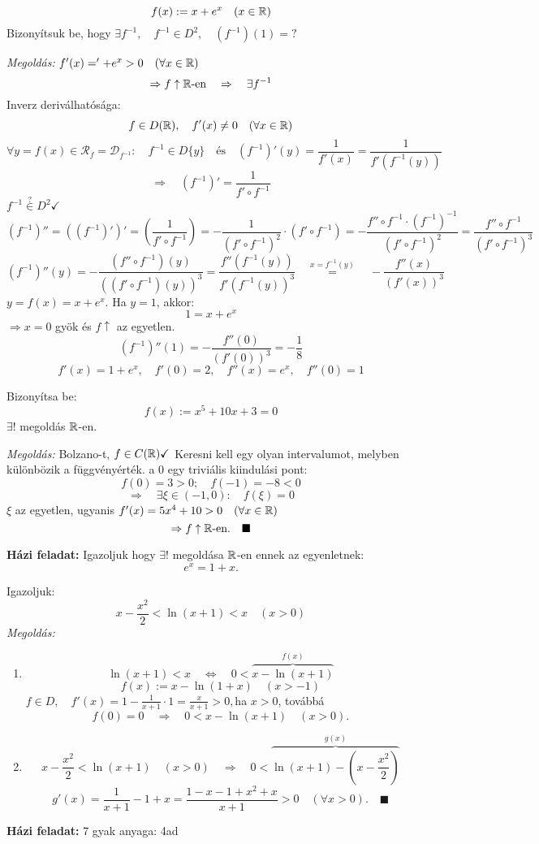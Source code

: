 \documentclass[a4paper,11.5pt]{article}
\begin{document}
	\begin{task}
		\[ f(x):=x+e^x\quad (x\in\mathbb{R}) \]
		Bizonyítsuk be, hogy $\exists f^{-1},\quad f^{-1}\in D^2,\quad (f^{-1})(1)=?$
		\medskip
		
		\textit{Megoldás:} $f'(x)='+e^x>0\quad (\forall x\in\mathbb{R})$
		\[ \Rightarrow f\uparrow \mathbb{R}\text{-en}\quad \Rightarrow\quad \exists f^{-1} \]
		Inverz deriválhatósága:
		\[ f\in D(\mathbb{R}),\quad f'(x)\not=0\quad (\forall x\in\mathbb{R}) \]
		\[ \forall y=f(x)\in\mathcal{R}_f=\mathcal{D}_{f^{-1}}:\quad f^{-1}\in D\{y\}\quad \text{és}\quad (f^{-1})'(y)=\frac{1}{f'(x)}=\frac{1}{f'(f^{-1}(y))} \]
		\[ \Rightarrow\quad (f^{-1})'=\frac{1}{f'\circ f^{-1}} \]
		$f^{-1}\overset{?}{\in}D^2\checkmark$
		\[ (f^{-1})''=((f^{-1})')'=\left(\frac{1}{f'\circ f^{-1}}\right)=-\frac{1}{(f'\circ f^{-1})^2}\cdot(f'\circ f^{-1})= -\frac{f''\circ f^{-1}\cdot(f^{-1})^{-1}}{(f'\circ f^{-1})^2}=\frac{f''\circ f^{-1}}{(f'\circ f^{-1})^3} \]
		\[ (f^{-1})''(y)=-\frac{(f''\circ f^{-1})(y)}{((f'\circ f^{-1})(y))^3}=\frac{f''(f^{-1}(y))}{f'(f^{-1}(y))^3}\quad \overset{x=f^{-1}(y)}{=}\quad -\frac{f''(x)}{(f'(x))^3} \]
		$y=f(x)=x+e^x$. Ha $y=1$, akkor:
		\[ 1=x+e^x \]
		$\Rightarrow x=0$ gyök és $f\uparrow$ az egyetlen.
		\[(f^{-1})''(1)=-\frac{f''(0)}{(f'(0))^3}=-\frac{1}{8} \]
		\[ f'(x)=1+e^x,\quad f'(0)=2,\quad f''(x)=e^x,\quad f''(0)=1 \]
	\end{task}
	\begin{task}
		Bizonyítsa be:
		\[ f(x):=x^5+10x+3=0 \]
		$\exists!$ megoldás $\mathbb{R}$-en.
		
		\textit{Megoldás:} Bolzano-t, $f\in C(\mathbb{R})\checkmark$ Keresni kell egy olyan intervalumot, melyben különbözik a függvényérték. a 0 egy triviális kiindulási pont:
		\[ f(0)=3>0;\quad f(-1)=-8<0 \]
		\[ \Rightarrow\quad \exists \xi\in(-1,0):\quad f(\xi)=0 \]
		$\xi$ az egyetlen, ugyanis $f'(x)=5x^4+10>0\quad (\forall x\in\mathbb{R})$
		\[ \Rightarrow f\uparrow \mathbb{R}\text{-en}.\quad \blacksquare \]
	\end{task}
	\textbf{Házi feladat:} Igazoljuk hogy $\exists!$ megoldása $\mathbb{R}$-en ennek az egyenletnek:
	\[ e^x=1+x. \]
	\begin{task}
		Igazoljuk:
		\[ x-\frac{x^2}{2}<\ln(x+1)<x\quad (x>0) \]
		\textit{Megoldás:} 
		\begin{enumerate}
			\item \[\ln(x+1)<x\quad \Leftrightarrow\quad 0<\overbrace{x-\ln(x+1)}^{f(x)} \]
			\[ f(x):=x-\ln(1+x)\quad (x>-1) \]
			$f\in D,\quad f'(x)=1-\frac{1}{x+1}\cdot1=\frac{x}{x+1}>0,$\quad ha $x>0$, továbbá
			\[ f(0)=0\quad \Rightarrow\quad 0<x-\ln(x+1)\quad (x>0). \]
			\item \[ x-\frac{x^2}{2}<\ln(x+1)\quad (x>0)\quad \Rightarrow\quad 0<\overbrace{\ln(x+1)-\left(x-\frac{x^2}{2}\right)}^{g(x)} \]
			\[ g'(x)=\frac{1}{x+1}-1+x=\frac{1-x-1+x^2+x}{x+1}>0\quad (\forall x>0).\quad \blacksquare \]
		\end{enumerate}
	\end{task}
	\textbf{Házi feladat:} 7 gyak anyaga: 4ad
\end{document}
